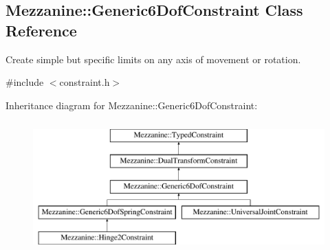 \hypertarget{classMezzanine_1_1Generic6DofConstraint}{
\subsection{Mezzanine::Generic6DofConstraint Class Reference}
\label{classMezzanine_1_1Generic6DofConstraint}
}


Create simple but specific limits on any axis of movement or rotation.  




{\ttfamily \#include $<$constraint.h$>$}

Inheritance diagram for Mezzanine::Generic6DofConstraint:\begin{figure}[H]
\begin{center}
\leavevmode
\includegraphics[height=5.000000cm]{classMezzanine_1_1Generic6DofConstraint}
\end{center}
\end{figure}
